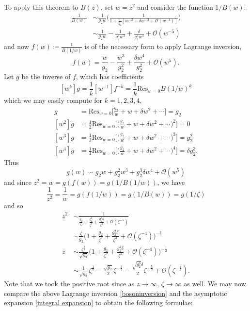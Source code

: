 \documentclass[10pt]{article}
\newcommand{\mcal}[1]{\mathcal{#1}}
\newcommand{\res}{\text{Res}}
\theoremstyle{plain}
\theoremstyle{definition}
\theoremstyle{plain}
\begin{document}
To apply this theorem to $B(z)$, set $w=z^2$ and consider the function $1/B(w)$:
\begin{align*}
	\frac{1}{B(w)} &\sim \frac{1}{g_2 w} \bigg(  \frac{1}{1 + \frac{1}{g_2}[ w^{-2} + \delta w^{-3} + \mcal{O}(w^{-4}) ]} \bigg) \\
	&\sim \frac{1}{g_2 w} - \frac{1}{g_2^2 w^3} + \frac{\delta}{g_2^2 w^4} + \mcal{O}(w^{-5})
\end{align*}
and now $f(w) \coloneqq \frac{1}{B(1/w)}$ is of the necessary form to apply Lagrange inversion,
\[ f(w) = \frac{w}{g_2} - \frac{w^3}{g_2^2} + \frac{\delta w^4}{g_2^2} + \mcal{O}(w^{5}). \] 
Let $g$ be the inverse of $f$, which has coefficients
\[ [w^k]g = \frac{1}{k}[w^{-1}]f^{-k} = \frac{1}{k}\res_{w=0} B(1/w)^k \]
which we may easily compute for $k=1,2,3,4$,
\begin{align*}
	[w]g &= \res_{w=0}\bigg[ \frac{g_2}{w} + w + \delta w^2 + \cdots \bigg] = g_2 \\
	[w^2]g &= \frac{1}{2}\res_{w=0} \bigg[ \bigg( \frac{g_2}{w} + w + \delta w^2 +\cdots\bigg)^2 \bigg]  = 0 \\
	[w^3]g &= \frac{1}{3}\res_{w=0}\bigg[ \bigg( \frac{g_2}{w} + w + \delta w^2 + \cdots \bigg)^3 \bigg] = g_2^2 \\
	[w^4]g &= \frac{1}{4}\res_{w=0}\bigg[\bigg( \frac{g_2}{w} + w + \delta w^2 + \cdots \bigg)^4\bigg] = \delta g_2^3.
\end{align*}
Thus 
\[ g(w) \sim g_2 w + g_2^2 w^3 + g_2^3\delta w^4 + \mcal{O}(w^5) \]
and since $z^2 = w = g(f(w)) = g(1/B(1/w))$, we have 
\[\frac{1}{z^2} = \frac{1}{w} = g(f(1/w)) = g(1/B(w))=g(1/\zeta)\]
and so
\begin{align}
	z^2 &\sim \frac{1}{\frac{g_2}{\zeta} + \frac{g_2^2}{\zeta^3} + \frac{g_2^3\delta}{\zeta^4} + \mcal{O}(\zeta^{-5})}  \nonumber\\
	&\sim \frac{\zeta}{g_2} \bigg( 1 + \frac{g_2}{\zeta^2} + \frac{g_2^2\delta}{\zeta^3} + \mcal{O}(\zeta^{-4}) \bigg)^{-1} \nonumber\\
	z &\sim \frac{\zeta^{\frac{1}{2}}}{\sqrt{g_2}}\bigg(  1 + \frac{g_2}{\zeta^2} + \frac{g_2^2\delta}{\zeta^3} + \mcal{O}(\zeta^{-4}) \bigg)^{-\frac{1}{2}} \nonumber\\
	&\sim \frac{1}{\sqrt{g_2}}\zeta^{\frac{1}{2}} - \frac{\sqrt{g_2}}{2}\zeta^{-\frac{3}{2}} - \frac{\sqrt{g_2^3}\delta}{2}\zeta^{-\frac{5}{2}} + \mcal{O}(\zeta^{-\frac{7}{2}}). \label{bosoninversion}
\end{align}
Note that we took the positive root since as $z\to \infty$, $\zeta\to\infty$ as well. We may now compare the above Lagrange inversion \ref{bosoninversion} and the asymptotic expansion \ref{integral expansion} to obtain the following formulae:
\end{document}
